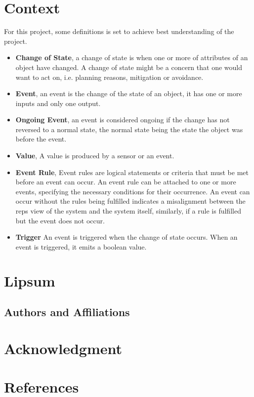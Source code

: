 \documentclass[conference]{IEEEtran}
\begin{document}
	\section{Context}
		For this project, some definitions is set to achieve best understanding of the project.
		\begin{itemize}
			\item \textbf{Change of State}, a change of state is when one or more of attributes of an object have changed. A change of state might be a concern that one would want to act on, i.e. planning reasons, mitigation or avoidance.
			\item \textbf{Event}, an event is the change of the state of an object, it has one or more inputs and  only one output.
			\item \textbf{Ongoing Event}, an event is considered ongoing if the change has not reversed to a normal state, the normal state being the state the object was before the event.
			\item \textbf{Value}, A value is produced by a sensor or an event.
			\item \textbf{Event Rule}, Event rules are logical statements or criteria that must be met before an event can occur. An event rule can be attached to one or more events, specifying the necessary conditions for their occurrence. An event can occur without the rules being fulfilled indicates a misalignment between the \gls{reps} view of the system and the system itself, similarly, if a rule is fulfilled but the event does not occur.
			\item \textbf{Trigger} An event is triggered when the change of state occurs. When an event is triggered, it emits a boolean value.
		\end{itemize}
	\section{Lipsum}
	
	\subsection{Authors and Affiliations}

	
	\section{Acknowledgment}
	
	\section*{References}
	
	
\end{document}
